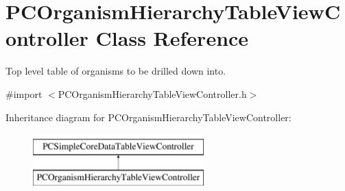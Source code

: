 \hypertarget{interface_p_c_organism_hierarchy_table_view_controller}{
\section{PCOrganismHierarchyTableViewController Class Reference}
\label{interface_p_c_organism_hierarchy_table_view_controller}
}


Top level table of organisms to be drilled down into.  




{\ttfamily \#import $<$PCOrganismHierarchyTableViewController.h$>$}

Inheritance diagram for PCOrganismHierarchyTableViewController:\begin{figure}[h!]
\begin{center}
\leavevmode
\includegraphics[height=2.000000cm]{kegg_doc/interface_p_c_organism_hierarchy_table_view_controller}
\end{center}
\end{figure}
